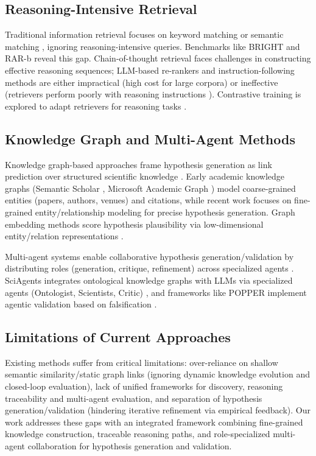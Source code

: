 \documentclass[runningheads]{llncs}
\begin{document}
\subsection{Reasoning-Intensive Retrieval}
Traditional information retrieval focuses on keyword matching \cite{robertson2009probabilistic} or semantic matching \cite{devlin2019bert}, ignoring reasoning-intensive queries. Benchmarks like BRIGHT \cite{su2024bright} and RAR-b \cite{xiao2024rar} reveal this gap. Chain-of-thought retrieval \cite{trivedi2023interleaving} faces challenges in constructing effective reasoning sequences; LLM-based re-rankers \cite{niu2024rankgpt,yang2024c} and instruction-following methods \cite{weller2024follow,weller2024prompting} are either impractical (high cost for large corpora) or ineffective (retrievers perform poorly with reasoning instructions \cite{xiao2024rar}). Contrastive training is explored to adapt retrievers for reasoning tasks \cite{shao2025reasonir}.

\subsection{Knowledge Graph and Multi-Agent Methods}
Knowledge graph-based approaches frame hypothesis generation as link prediction over structured scientific knowledge \cite{borrego2025research,de2021discovering}. Early academic knowledge graphs (Semantic Scholar \cite{ammar2018construction}, Microsoft Academic Graph \cite{wang2020microsoft}) model coarse-grained entities (papers, authors, venues) and citations, while recent work focuses on fine-grained entity/relationship modeling \cite{luan2018multi} for precise hypothesis generation. Graph embedding methods score hypothesis plausibility via low-dimensional entity/relation representations \cite{rossi2021knowledge,wang2021survey}.

Multi-agent systems enable collaborative hypothesis generation/validation by distributing roles (generation, critique, refinement) across specialized agents \cite{ghafarollahi2025sciagents,ke2025biodisco}. SciAgents integrates ontological knowledge graphs with LLMs via specialized agents (Ontologist, Scientists, Critic) \cite{ghafarollahi2025sciagents}, and frameworks like POPPER implement agentic validation based on falsification \cite{huang2025automated}.

\subsection{Limitations of Current Approaches}
Existing methods suffer from critical limitations: over-reliance on shallow semantic similarity/static graph links (ignoring dynamic knowledge evolution and closed-loop evaluation), lack of unified frameworks for discovery, reasoning traceability and multi-agent evaluation, and separation of hypothesis generation/validation (hindering iterative refinement via empirical feedback). Our work addresses these gaps with an integrated framework combining fine-grained knowledge construction, traceable reasoning paths, and role-specialized multi-agent collaboration for hypothesis generation and validation.
\end{document}
